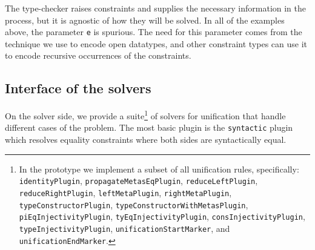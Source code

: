 The type-checker raises constraints and supplies the necessary
information in the process, but it is agnostic of how they will be
solved. In all of the examples above, the parameter \texttt{e} is
spurious. The need for this parameter comes from the technique we use to
encode open datatypes, and other constraint types can use it to encode
recursive occurrences of the constraints.

\hypertarget{sec:solvers-interface}{%
\subsection{Interface of the solvers}\label{sec:solvers-interface}}

On the solver side, we provide a suite\footnote{In the prototype we
  implement a subset of all unification rules, specifically:
  \texttt{identityPlugin}, \texttt{propagateMetasEqPlugin},
  \texttt{reduceLeftPlugin}, \texttt{reduceRightPlugin},
  \texttt{leftMetaPlugin}, \texttt{rightMetaPlugin},
  \texttt{typeConstructorPlugin},
  \texttt{typeConstructorWithMetasPlugin},
  \texttt{piEqInjectivityPlugin}, \texttt{tyEqInjectivityPlugin},
  \texttt{consInjectivityPlugin}, \texttt{typeInjectivityPlugin},
  \texttt{unificationStartMarker}, and \texttt{unificationEndMarker}.}
of solvers for unification that handle different cases of the problem.
The most basic plugin is the \texttt{syntactic} plugin which resolves
equality constraints where both sides are syntactically equal.

\begin{imageonly}
\begin{Shaded}
\begin{Highlighting}[]
\NormalTok{ (} \OperatorTok{:\textless{}:}
                 \OtherTok{=\textgreater{}} 
\OtherTok{=} 
  \OtherTok{=}
    \NormalTok{ (}\OtherTok{{-}\textgreater{}}
       \OperatorTok{$}
     \OtherTok{{-}\textgreater{}}
       
\NormalTok{ (} \OperatorTok{:\textless{}:}
                \OtherTok{=\textgreater{}}  
 
\OtherTok{=} \OtherTok{=}
\OtherTok{=}
\NormalTok{                    \}}
\end{Highlighting}
\end{Shaded}
\end{imageonly}

